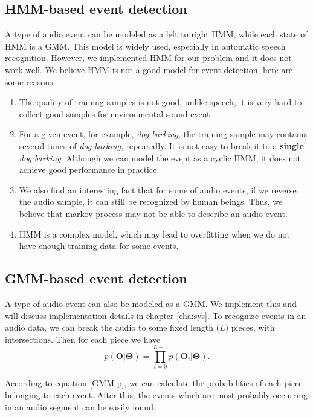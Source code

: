 \subsection{HMM-based event detection}
A type of audio event can be modeled as a left to right HMM, while each state of HMM is a GMM. This model is widely used, especially in automatic speech recognition. However, we implemented HMM for our problem and it does not work well. We believe HMM is not a good model for event detection, here are some reasons:
\begin{enumerate}
\item The quality of training samples is not good, unlike speech, it is very hard to collect good samples for environmental sound event.
\item For a given event, for example, {\em dog barking}, the training sample may contains several times of {\em dog barking}, repeatedly. It is not easy to break it to a {\bf single} {\em dog barking}. Although we can model the event as a cyclic HMM, it does not achieve good performance in practice.
\item We also find an interesting fact that for some of audio events, if we reverse the audio sample, it can still be recognized by human beings. Thus, we believe that markov process may not be able to describe an audio event.
\item HMM is a complex model, which may lead to overfitting when we do not have enough training data for some events.
\end{enumerate}
\subsection{GMM-based event detection}
A type of audio event can also be modeled as a GMM. We implement this and will discuss implementation details in chapter \ref{cha:sys}. To recognize events in an audio data, we can break the audio to some fixed length ($L$) pieces, with intersections. Then for each piece we have
\begin{equation}
\label{pp}
p(\mathbf{O}|\mathbf{\Theta}) = \prod_{i=0}^{L - 1}p(\mathbf{O_i}|\mathbf{\Theta}).
\end{equation}

According to equation \ref{GMM-p}, we can calculate the probabilities of each piece belonging to each event. After this, the events which are most probably occurring in an audio segment can be easily found.

